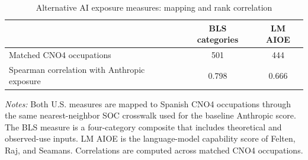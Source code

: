 \begin{table}[H]
\centering
\caption{Alternative AI exposure measures: mapping and rank correlation}
\label{tab:v1_alternative_exposure_validation}
\begin{threeparttable}
\small
\begin{tabular}{lcc}
\toprule
& BLS categories & LM AIOE \\
\midrule
Matched CNO4 occupations & 501 & 444 \\
Spearman correlation with Anthropic exposure & 0.798 & 0.666 \\
\bottomrule
\end{tabular}
\begin{tablenotes}[flushleft]
\footnotesize
\item \emph{Notes:} Both U.S. measures are mapped to Spanish CNO4 occupations through the same nearest-neighbor SOC crosswalk used for the baseline Anthropic score. The BLS measure is a four-category composite that includes theoretical and observed-use inputs. LM AIOE is the language-model capability score of Felten, Raj, and Seamans. Correlations are computed across matched CNO4 occupations.
\end{tablenotes}
\end{threeparttable}
\end{table}
